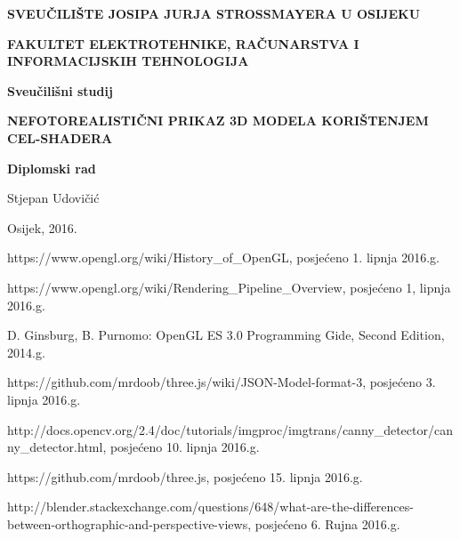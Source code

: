 \documentclass[a4paper,12pt]{extarticle}
\begin{document}
\begin{titlepage}
	\centering
	{\bfseries SVEUČILIŠTE JOSIPA JURJA STROSSMAYERA U OSIJEKU\par}
	{\bfseries FAKULTET ELEKTROTEHNIKE, RAČUNARSTVA I INFORMACIJSKIH TEHNOLOGIJA\par}
	
	\vspace{2cm}
	{\bfseries Sveučilišni studij\par}

	\vspace{4cm}
	{\huge\bfseries NEFOTOREALISTIČNI PRIKAZ 3D MODELA KORIŠTENJEM CEL-SHADERA\par}
	
	\vspace{1cm}
	{\bfseries Diplomski rad\par}
	
	\vspace{2cm}
	{\Large Stjepan Udovičić\par}
	
	\vfill
	{Osijek, 2016.\par}
\end{titlepage}

\tableofcontents











\begin{thebibliography}{9}

	https://www.opengl.org/wiki/History\_of\_OpenGL, posjećeno  1. lipnja 2016.g.

	https://www.opengl.org/wiki/Rendering\_Pipeline\_Overview, posjećeno 1, lipnja 2016.g.
	
	D. Ginsburg, B. Purnomo: OpenGL ES 3.0 Programming Gide, Second Edition, 2014.g.

	https://github.com/mrdoob/three.js/wiki/JSON-Model-format-3, posjećeno 3. lipnja 2016.g.

	http://docs.opencv.org/2.4/doc/tutorials/imgproc/imgtrans/canny\_detector/canny\_detector.html, posjećeno 10. lipnja 2016.g.

	https://github.com/mrdoob/three.js, posjećeno 15. lipnja 2016.g.

	http://blender.stackexchange.com/questions/648/what-are-the-differences-between-orthographic-and-perspective-views, posjećeno 6. Rujna 2016.g.

\end{thebibliography}
\end{document}
